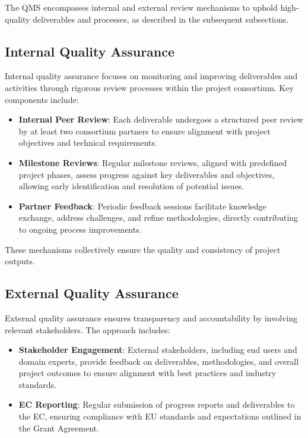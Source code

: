 \documentclass[a4paper,12pt]{article}
\begin{document}
The QMS encompasses internal and external review mechanisms to uphold high-quality deliverables and processes, as described in the subsequent subsections.

\subsection{\textcolor{EUblue}{Internal Quality Assurance}}

Internal quality assurance focuses on monitoring and improving deliverables and activities through rigorous review processes within the project consortium. Key components include:

\begin{itemize}[left=1em, itemsep=0pt, topsep=0pt]
    \item \textbf{Internal Peer Review}: Each deliverable undergoes a structured peer review by at least two consortium partners to ensure alignment with project objectives and technical requirements.
    \item \textbf{Milestone Reviews}: Regular milestone reviews, aligned with predefined project phases, assess progress against key deliverables and objectives, allowing early identification and resolution of potential issues. 
    \item \textbf{Partner Feedback}: Periodic feedback sessions facilitate knowledge exchange, address challenges, and refine methodologies, directly contributing to ongoing process improvements.
\end{itemize}

These mechanisms collectively ensure the quality and consistency of project outputs.

\subsection{\textcolor{EUblue}{External Quality Assurance}}

External quality assurance ensures transparency and accountability by involving relevant stakeholders. The approach includes:

\begin{itemize}[left=1em, itemsep=0pt, topsep=0pt]
    \item \textbf{Stakeholder Engagement}: External stakeholders, including end users and domain experts, provide feedback on deliverables, methodologies, and overall project outcomes to ensure alignment with best practices and industry standards.
    \item \textbf{EC Reporting}: Regular submission of progress reports and deliverables to the EC, ensuring compliance with EU standards and expectations outlined in the Grant Agreement.
\end{itemize}
\end{document}

